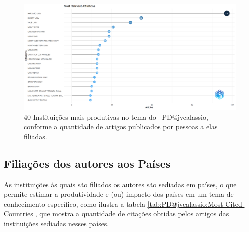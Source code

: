 \begin{figure}
    \centering
    \includegraphics[width=1\textwidth]{exploratory-data-analysis/jvcalassio/PesqBibliogr/PrisonersDilemma/WoS-20221201/Dataset/MostRelevantAffiliations-2022-12-03.png}
    \caption{40 Instituições mais produtivas no tema do \dataset\ PD@jvcalassio, conforme a quantidade de artigos publicados por pessoas a elas filiadas.}
    \label{fig:PD@jvcalassio:Most-Relevant-Affiliations}
\end{figure}

\subsection{Filiações dos autores aos Países}

As instituições às quais são filiados os autores são sediadas em países, o que permite estimar a produtividade e (ou) impacto dos países em um tema de conhecimento específico, como ilustra a tabela \ref{tab:PD@jvcalassio:Most-Cited-Countries}, que mostra a quantidade de citações obtidas pelos artigos das instituições sediadas nesses países.

